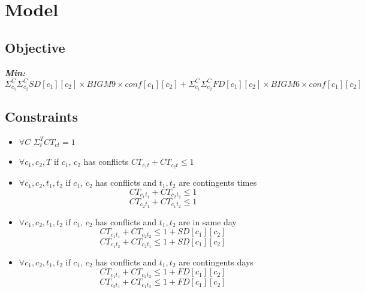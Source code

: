 \documentclass{report}
\begin{document}
\section{Model}
\subsection{Objective}

\textbf{ \textit{Min:} } $\Sigma_{c_1}^{C} \Sigma_{c_2}^{C} SD[c_1][c_2] \times BIGM9 \times conf[c_1][c_2] + \Sigma_{c_1}^{C} \Sigma_{c_2}^{C} FD[c_1][c_2] \times BIGM6 \times conf[c_1][c_2]  $  \newline 

\subsection{Constraints}

\begin{itemize}
\item{$\forall C$ \space $\Sigma_t^T CT_{ct} = 1$}

\item{$\forall c_1 , c_2 , T $ \space if $c_1$, $c_2$ has conflicts $CT_{c_1 t} + CT_{c_2 t} \le 1$ }

\item{$\forall c_1 , c_2 , t_1 , t_2$ \space if $c_1$, $c_2$ has conflicts and $t_1, t_2$ are contingents times $$CT_{c_1 t_1} + CT_{c_2 t_2} \le 1$$ $$CT_{c_2 t_1} + CT_{c_1 t_2} \le 1 $$ }

\item{$\forall c_1 , c_2 , t_1, t_2 $ \space if $c_1$, $c_2$ has conflicts and $t_1 ,t_2 $ are in same day $$CT_{c_1 t_1} + CT_{c_2 t_2} \le 1 + SD[c_1][c_2]$$ 
$$CT_{c_1 t_2} + CT_{c_2 t_1} \le 1 + SD[c_1][c_2]$$}


\item{$\forall c_1 ,  c_2 ,  t_1 , t_2$ \space if $c_1$, $c_2$ has conflicts and $t_1 , t_2$ are contingents days $$CT_{c_1 t_1} + CT_{c_2 t_2} \le 1 + FD[c_1][c_2]$$ $$CT_{c_2 t_1} + CT_{c_1 t_2} \le 1 + FD[c_1][c_2]$$  }

\end{itemize}
\end{document}
